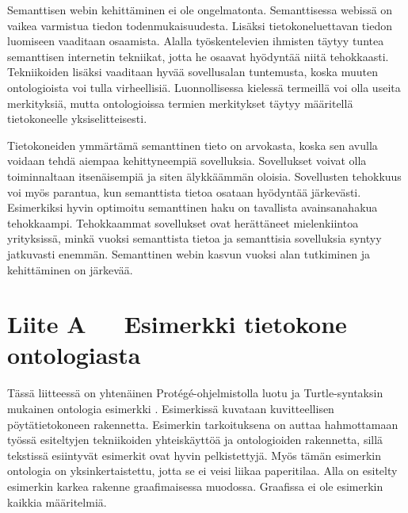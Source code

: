 \documentclass[finnish, 12pt, a4paper, elec, utf8, pdfa, online]{aaltothesis}
\begin{document}
{Semanttisen webin kehittäminen ei ole ongelmatonta. Semanttisessa webissä on vaikea varmistua tiedon todenmukaisuudesta. Lisäksi tietokoneluettavan tiedon luomiseen vaaditaan osaamista. Alalla työskentelevien ihmisten täytyy tuntea semanttisen internetin tekniikat, jotta he osaavat hyödyntää niitä tehokkaasti. Tekniikoiden lisäksi vaaditaan hyvää sovellusalan tuntemusta, koska muuten ontologioista voi tulla virheellisiä. Luonnollisessa kielessä termeillä voi olla useita merkityksiä, mutta ontologioissa termien merkitykset täytyy määritellä tietokoneelle yksiselitteisesti.

Tietokoneiden ymmärtämä semanttinen tieto on arvokasta, koska sen avulla voidaan tehdä aiempaa kehittyneempiä sovelluksia. Sovellukset voivat olla toiminnaltaan itsenäisempiä ja siten älykkäämmän oloisia. Sovellusten tehokkuus voi myös parantua, kun semanttista tietoa osataan hyödyntää järkevästi. Esimerkiksi hyvin optimoitu semanttinen haku on tavallista avainsanahakua tehokkaampi. Tehokkaammat sovellukset ovat herättäneet mielenkiintoa yrityksissä, minkä vuoksi semanttista tietoa ja semanttisia sovelluksia syntyy jatkuvasti enemmän. Semanttinen webin kasvun vuoksi alan tutkiminen ja kehittäminen on järkevää.


\clearpage

\clearpage
\thesisappendix
\section*{Liite A\ \ \ Esimerkki tietokone ontologiasta \label{Liite A}}

Tässä liitteessä on yhtenäinen Protégé-ohjelmistolla luotu ja Turtle-syntaksin mukainen ontologia esimerkki \cite{Protege}. Esimerkissä kuvataan kuvitteellisen pöytätietokoneen rakennetta. Esimerkin tarkoituksena on auttaa hahmottamaan työssä esiteltyjen tekniikoiden yhteiskäyttöä ja ontologioiden rakennetta, sillä tekstissä esiintyvät esimerkit ovat hyvin pelkistettyjä. Myös tämän esimerkin ontologia on yksinkertaistettu, jotta se ei veisi liikaa paperitilaa. Alla on esitelty esimerkin karkea rakenne graafimaisessa muodossa. Graafissa ei ole esimerkin kaikkia määritelmiä.

}
\end{document}

